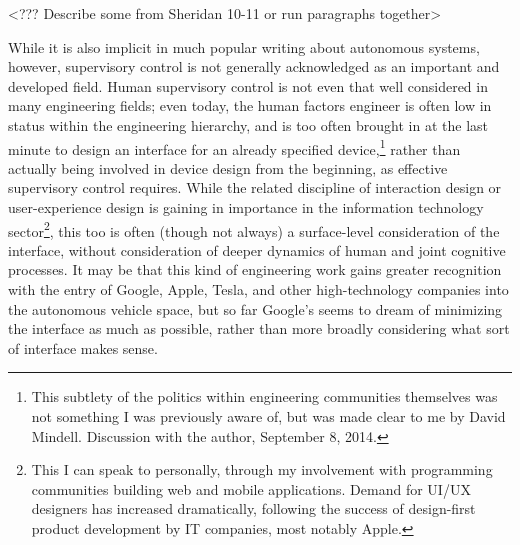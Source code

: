 <??? Describe some from Sheridan 10-11 or run paragraphs together>

 While it is also
implicit in much popular writing about autonomous systems, however,
supervisory control is not generally acknowledged as an important and
developed field. Human supervisory control is not even that well
considered in many engineering fields; even today, the human factors
engineer is often low in status within the engineering hierarchy, and
is too often brought in at the last minute to design an interface for
an already specified device,\footnote{This subtlety of the politics
  within engineering communities themselves was not something I was
  previously aware of, but was made clear to me by David Mindell.
  Discussion with the author, September 8, 2014.} rather than actually being involved in
device design from the beginning, as effective supervisory control
requires. While the related discipline of interaction design or
user-experience design is gaining in importance in the information
technology sector\footnote{This I can speak to personally, through my
  involvement with programming communities building web and mobile
  applications. Demand for UI/UX designers has increased dramatically,
following the success of design-first product development by IT
companies, most notably Apple.}, this too is often (though not always) a surface-level
consideration of the interface, without consideration of deeper
dynamics of human and joint cognitive processes. It may be
that this kind of engineering work gains greater recognition with the
entry of Google, Apple, Tesla, and other high-technology companies
into the autonomous vehicle space, but so far Google's seems to dream
of minimizing the interface as much as possible, rather than more
broadly considering what sort of interface makes sense.\cite{???}

